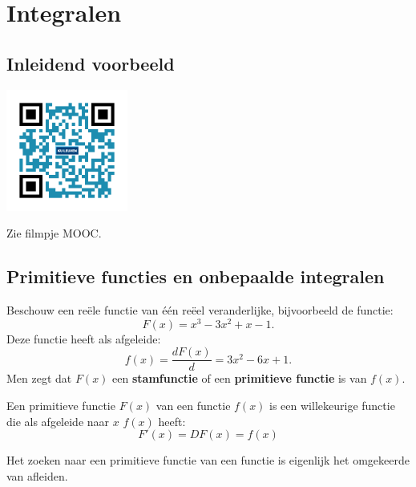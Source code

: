 \section{Integralen}

\subsection{Inleidend voorbeeld}
\begin{minipage}{.25\linewidth}
	\raggedright
	\includegraphics[width=4cm]{6_afgeleiden_integralen/inputs/QR_Code_INLEIDENDVB_module6_2}
\end{minipage}
\begin{minipage}{.7\linewidth}
	Zie filmpje MOOC.
\end{minipage}

\subsection{Primitieve functies en onbepaalde integralen}

Beschouw een re\"ele functie van \'e\'en re\"eel veranderlijke, bijvoorbeeld de functie:
\begin{equation*}
F(x) = x^3-3x^2+x-1.
\end{equation*}
Deze functie heeft als afgeleide:
\begin{equation*}
f(x) = \frac{dF(x)}{d} = 3x^2-6x+1.
\end{equation*}
Men zegt dat $F(x)$ een \textbf{stamfunctie} of een \textbf{primitieve functie} is van $f(x)$.

\begin{definitie}
Een primitieve functie $F(x)$ van een functie $f(x)$ is een willekeurige functie die als afgeleide naar $x$ $f(x)$  heeft:	
\begin{equation*}
F'(x)=DF(x)=f(x)
\end{equation*}
\end{definitie}

Het zoeken naar een primitieve functie van een functie is eigenlijk het omgekeerde van afleiden.

